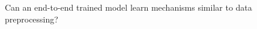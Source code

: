 {
	\begin{frame}[plain]
	
	\vspace{8em}
	\begin{center}
		\Huge\color{tumwhite}
		Can an end-to-end trained model learn mechanisms similar to data preprocessing?
	\end{center}\color{white}
	
\end{frame}
}